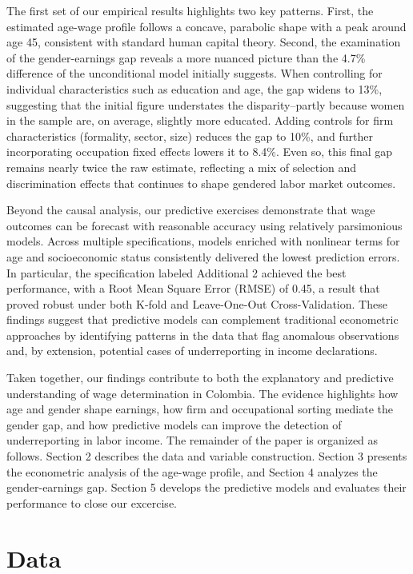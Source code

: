 \documentclass[12pt,a4paper,onecolumn]{article}
\begin{document}
The first set of our empirical results highlights two key patterns. First, the estimated age-wage profile follows a concave, parabolic shape with a peak around age 45, consistent with standard human capital theory. Second, the examination of the gender-earnings gap reveals a more nuanced picture than the 4.7\% difference of the unconditional model initially suggests. When controlling for individual characteristics such as education and age, the gap widens to 13\%, suggesting that the initial figure understates the disparity--partly because women in the sample are, on average, slightly more educated. Adding controls for firm characteristics (formality, sector, size) reduces the gap to 10\%, and further incorporating occupation fixed effects lowers it to 8.4\%. Even so, this final gap remains nearly twice the raw estimate, reflecting a mix of selection and discrimination effects that continues to shape gendered labor market outcomes.

Beyond the causal analysis, our predictive exercises demonstrate that wage outcomes can be forecast with reasonable accuracy using relatively parsimonious models. Across multiple specifications, models enriched with nonlinear terms for age and socioeconomic status consistently delivered the lowest prediction errors. In particular, the specification labeled Additional 2 achieved the best performance, with a Root Mean Square Error (RMSE) of 0.45, a result that proved robust under both K-fold and Leave-One-Out Cross-Validation. These findings suggest that predictive models can complement traditional econometric approaches by identifying patterns in the data that flag anomalous observations and, by extension, potential cases of underreporting in income declarations.

Taken together, our findings contribute to both the explanatory and predictive understanding of wage determination in Colombia. The evidence highlights how age and gender shape earnings, how firm and occupational sorting mediate the gender gap, and how predictive models can improve the detection of underreporting in labor income. The remainder of the paper is organized as follows. Section 2 describes the data and variable construction. Section 3 presents the econometric analysis of the age-wage profile, and Section 4 analyzes the gender-earnings gap. Section 5 develops the predictive models and evaluates their performance to close our excercise.

\section{Data}
\end{document}
